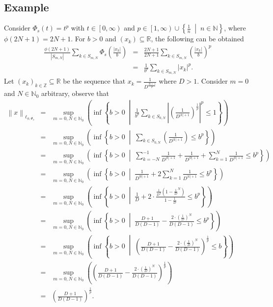 \documentclass[12pt,a4paper]{article}
\theoremstyle{remark}
\begin{document}
\subsection{Example}
 Consider $\Phi_s\left(t\right) = t^p$ with $t \in \left[0, \infty\right)$ and $p\in\left[1,\infty\right)\cup\left\{\frac{1}{n} \;\middle|\; n\in\mathbb{N}\right\}$, where $\phi\left(2N+1\right) = 2N+1$. For $b > 0$ and $\left(x_k\right) \subseteq \mathbb{R}$, the following can be obtained
\begin{eqnarray*}
    \frac{\phi\left(2N+1\right)}{\left|S_{m,N}\right|}\sum_{k\in S_{m,N}}\Phi_s\left(\frac{\left|x_k\right|}{b}\right)&=&\frac{2N+1}{2N+1}\sum_{k\in S_{m,N}}{\left(\frac{\left|x_k\right|}{b}\right)}^p\\
    &=&\frac{1}{b^p}\sum_{k\in S_{m,N}}{\left|x_k\right|}^p.
\end{eqnarray*}
Let $\left(x_k\right)_{k\in\mathbb{Z}}\subseteq\mathbb{R}$ be the sequence that $x_k=\frac{1}{D^{\frac{\left|k\right|+1}{p}}}$ where $D>1$. Consider $m=0$ and $N\in\mathbb{N}_0$ arbitrary, observe that\\
\begin{eqnarray*}
    \left\lVert x\right\rVert _{\ell_{\phi,\Phi_s}} &=& \sup_{m=0, N \in \mathbb{N}_0} \left(\inf \left\{ b > 0 \;\middle|\; \frac{1}{b^p} \sum_{k \in S_{0,N}} {\left|{\left(\frac{1}{D^{\left|k\right|+1}} \right)}^{\frac{1}{p}}\right|}^{p} \leq 1 \right\} \right)\\
    &=& \sup_{m=0, N \in \mathbb{N}_0} \left(\inf \left\{ b > 0 \;\middle|\; \sum_{k \in S_{0,N}} \left(\frac{1}{D^{\left|k\right|+1}}\right) \leq b^p \right\}\right)\\
    &=& \sup_{m=0, N \in \mathbb{N}_0} \left(\inf \left\{ b > 0 \;\middle|\; \sum_{k=-N}^{-1} \frac{1}{D^{\left|k\right|+1}}+\frac{1}{D^{\left|0\right|+1}}+\sum_{k=1}^{N} \frac{1}{D^{\left|k\right|+1}} \leq b^p \right\}\right)\\
    &=& \sup_{m=0, N \in \mathbb{N}_0} \left(\inf \left\{ b > 0 \;\middle|\;\frac{1}{D^{\left|0\right|+1}}+2\sum_{k=1}^{N} \frac{1}{D^{\left|k\right|+1}} \leq b^p \right\}\right)\\
    &=& \sup_{m=0, N \in \mathbb{N}_0} \left(\inf \left\{ b > 0 \;\middle|\; \frac{1}{D}+2 \cdot \frac{\frac{1}{D^2}\left(1-{\frac{1}{D}}^N\right)}{1-\frac{1}{D}} \leq b^p \right\}\right)\\
    &=& \sup_{m=0, N \in \mathbb{N}_0} \left(\inf \left\{ b > 0 \;\middle|\; \frac{D+1}{D\left(D-1\right)}-\frac{2\cdot{\left(\frac{1}{D}\right)}^N}{D\left(D-1\right)} \leq b^p \right\}\right)\\
    &=& \sup_{m=0, N \in \mathbb{N}_0} \left(\inf \left\{ b > 0 \;\middle|\; \left(\frac{D+1}{D\left(D-1\right)}-\frac{2\cdot{\left(\frac{1}{D}\right)}^N}{D\left(D-1\right)}\right)^{\frac{1}{p}} \leq b \right\}\right)\\
    &=& \sup_{m=0, N \in \mathbb{N}_0} \left(\left(\frac{D+1}{D\left(D-1\right)}-\frac{2\cdot{\left(\frac{1}{D}\right)}^N}{D\left(D-1\right)}\right)^{\frac{1}{p}} \right)\\
    &=& \left(\frac{D+1}{D\left(D-1\right)}\right)^{\frac{1}{p}}.
\end{eqnarray*}
\end{document}

